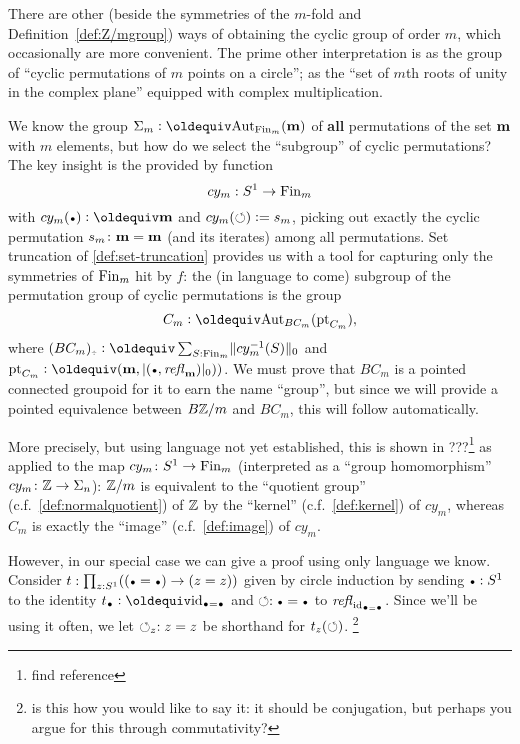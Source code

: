 \begin{example}

There are other (beside the symmetries of the $m$-fold \covering and Definition~\ref{def:Z/mgroup}) ways of obtaining the cyclic group of order $m$, which occasionally are more convenient.  The prime other interpretation is as the group of ``cyclic permutations of $m$ points on a circle''; \ie as the ``set of $m$th roots of unity in the complex plane'' equipped with complex multiplication.  

We know the group $\Sigma_m\defequi\aut_{\fin_m}(\bn m)$ of {\bf all} permutations of the set $\mathbf{m}$ with $m$ elements, but how do we select the ``subgroup'' of cyclic permutations?  
The key insight is the provided by function 
$$cy_m:S^1\to\operatorname{Fin}_m$$ 
with $cy_m(\base)\defequi\bn m$ and 
$cy_m(\circlearrowleft)\vcentcolon= s_m$, picking out exactly the cyclic permutation $s_m\colon\mathbf{m}=\mathbf{m}$ (and its iterates) among all permutations.  Set truncation of \cref{def:set-truncation} provides us with a tool for capturing only the symmetries of $\operatorname{Fin}_m$ hit by $f$: the (in language to come) subgroup of the permutation group of cyclic permutations is the group
$$C_m\defequi\aut_{BC_m}(\pt_{C_m}),$$
where $(BC_m)_\div\defequi \sum_{S:\fin_m}\Trunc{cy_m^{-1}(S)}_0$ and $\pt_{C_m}\defequi (\bn m,\trunc{(\base,\refl{\bn m})}_0))$.  We must prove that $BC_m$ is a pointed connected groupoid for it to earn the name ``group'', but since we will provide a pointed equivalence between $B\mathbb{Z}/m$ and $BC_m$, this will follow automatically.

More precisely, but using language not yet established, this is shown in ???\footnote{find reference} as applied to the map $cy_m\colon S^1\to\operatorname{Fin}_m$ (interpreted as a ``group homomorphism'' $cy_m\colon \mathbb{Z}\to\Sigma_n$): $\mathbb{Z}/m$ is equivalent to the ``quotient group'' (c.f.~\cref{def:normalquotient}) of $\mathbb{Z}$ by the ``kernel'' (c.f.~\cref{def:kernel}) of $cy_m$, whereas $C_m$ is exactly the ``image'' (c.f.~\cref{def:image}) of $cy_m$.  

However, in our special case we can give a proof using only language we know.
Consider $t:\prod_{z:S^1}((\base=\base)\to(z=z))$ given by circle induction by sending $\base:S^1$ to the identity $t_\base\defequi\id_{\base=\base}$ and $\Sloop:\base=\base$ to $\refl{\id_{\base=\base}}$.
Since we'll be using it often, we let $\circlearrowleft_z:z=z$ be shorthand for $t_z(\circlearrowleft)$.
\footnote{is this how you would like to say it: it should be conjugation, but perhaps you argue for this through commutativity?} 


\end{example}
